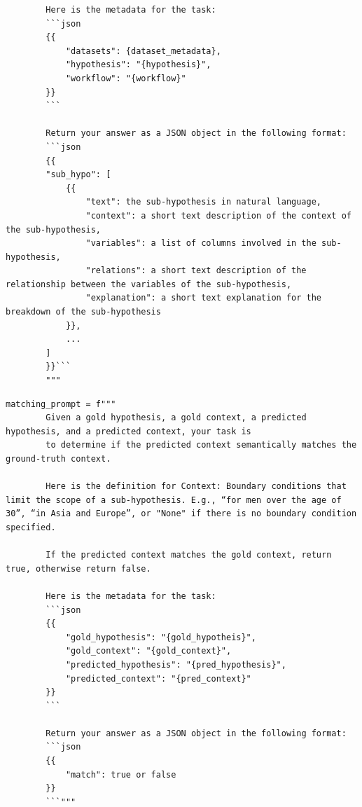 \begin{listing}[!ht]
\begin{verbatim}
        Here is the metadata for the task:
        ```json
        {{
            "datasets": {dataset_metadata},
            "hypothesis": "{hypothesis}",
            "workflow": "{workflow}"
        }}
        ```

        Return your answer as a JSON object in the following format:
        ```json
        {{
        "sub_hypo": [
            {{
                "text": the sub-hypothesis in natural language,
                "context": a short text description of the context of the sub-hypothesis,
                "variables": a list of columns involved in the sub-hypothesis,
                "relations": a short text description of the relationship between the variables of the sub-hypothesis,
                "explanation": a short text explanation for the breakdown of the sub-hypothesis
            }},
            ...
        ]
        }}```
        """
\end{verbatim}
\vspace{-1em}
\caption{Decomposition Prompt to obtain sub-hypotheses from a hypothesis.}
\label{list:decompose}
\end{listing}

\begin{listing}[!ht]
\begin{verbatim}
matching_prompt = f"""
        Given a gold hypothesis, a gold context, a predicted hypothesis, and a predicted context, your task is
        to determine if the predicted context semantically matches the ground-truth context.
        
        Here is the definition for Context: Boundary conditions that limit the scope of a sub-hypothesis. E.g., “for men over the age of 30”, “in Asia and Europe”, or "None" if there is no boundary condition specified.
        
        If the predicted context matches the gold context, return true, otherwise return false.

        Here is the metadata for the task:
        ```json
        {{
            "gold_hypothesis": "{gold_hypotheis}",
            "gold_context": "{gold_context}",
            "predicted_hypothesis": "{pred_hypothesis}",
            "predicted_context": "{pred_context}"
        }}
        ```

        Return your answer as a JSON object in the following format:
        ```json
        {{
            "match": true or false
        }}
        ```"""
\end{verbatim}
\vspace{-1em}
\caption{Matching prompt to match contexts of two sub-hypotheses.}
\label{list:match}
\end{listing}

